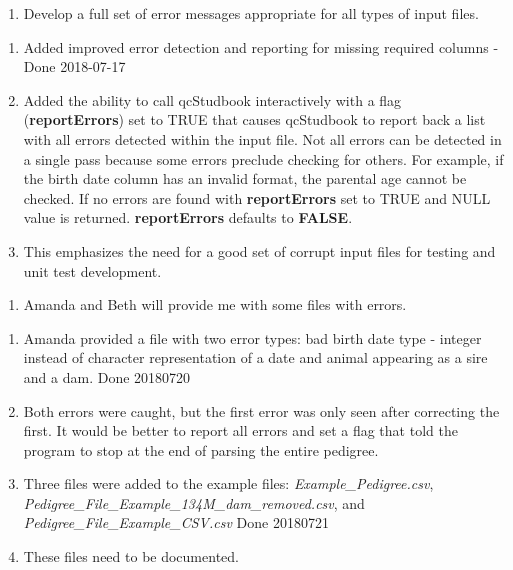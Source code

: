\documentclass[
]{article}
\providecommand{\tightlist}{%
  \setlength{\itemsep}{0pt}\setlength{\parskip}{0pt}}
\begin{document}
\begin{enumerate}
\def\labelenumi{\arabic{enumi}.}
\tightlist
\item
  Develop a full set of error messages appropriate for all types of
  input files.
\end{enumerate}

\begin{enumerate}
\def\labelenumi{\alph{enumi}.}
\tightlist
\item
  Added improved error detection and reporting for missing required
  columns - Done 2018-07-17
\item
  Added the ability to call qcStudbook interactively with a flag
  (\textbf{reportErrors}) set to TRUE that causes qcStudbook to report
  back a list with all errors detected within the input file. Not all
  errors can be detected in a single pass because some errors preclude
  checking for others. For example, if the birth date column has an
  invalid format, the parental age cannot be checked. If no errors are
  found with \textbf{reportErrors} set to TRUE and NULL value is
  returned. \textbf{reportErrors} defaults to \textbf{FALSE}.
\item
  This emphasizes the need for a good set of corrupt input files for
  testing and unit test development.
\end{enumerate}

\begin{enumerate}
\def\labelenumi{\arabic{enumi}.}
\setcounter{enumi}{1}
\tightlist
\item
  Amanda and Beth will provide me with some files with errors.
\end{enumerate}

\begin{enumerate}
\def\labelenumi{\alph{enumi}.}
\tightlist
\item
  Amanda provided a file with two error types: bad birth date type -
  integer instead of character representation of a date and animal
  appearing as a sire and a dam. Done 20180720
\item
  Both errors were caught, but the first error was only seen after
  correcting the first. It would be better to report all errors and set
  a flag that told the program to stop at the end of parsing the entire
  pedigree.
\item
  Three files were added to the example files:
  \emph{Example\_Pedigree.csv},
  \emph{Pedigree\_File\_Example\_134M\_dam\_removed.csv}, and
  \emph{Pedigree\_File\_Example\_CSV.csv} Done 20180721
\item
  These files need to be documented.
\end{enumerate}
\end{document}
